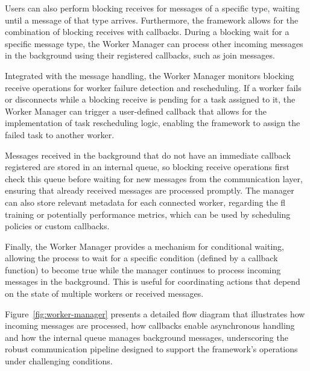 Users can also perform blocking receives for messages of a specific type, waiting until a message of that type arrives. Furthermore, the framework allows for the combination of blocking receives with callbacks. During a blocking wait for a specific message type, the Worker Manager can process other incoming messages in the background using their registered callbacks, such as join messages.

Integrated with the message handling, the Worker Manager monitors blocking receive operations for worker failure detection and rescheduling. If a worker fails or disconnects while a blocking receive is pending for a task assigned to it, the Worker Manager can trigger a user-defined callback that allows for the implementation of task rescheduling logic, enabling the framework to assign the failed task to another worker.

Messages received in the background that do not have an immediate callback registered are stored in an internal queue, so blocking receive operations first check this queue before waiting for new messages from the communication layer, ensuring that already received messages are processed promptly. The manager can also store relevant metadata for each connected worker, regarding the \ac{fl} training or potentially performance metrics, which can be used by scheduling policies or custom callbacks.

Finally, the Worker Manager provides a mechanism for conditional waiting, allowing the process to wait for a specific condition (defined by a callback function) to become true while the manager continues to process incoming messages in the background. This is useful for coordinating actions that depend on the state of multiple workers or received messages.

Figure~\ref{fig:worker-manager} presents a detailed flow diagram that illustrates how incoming messages are processed, how callbacks enable asynchronous handling and how the internal queue manages background messages, underscoring the robust communication pipeline designed to support the framework's operations under challenging conditions.

